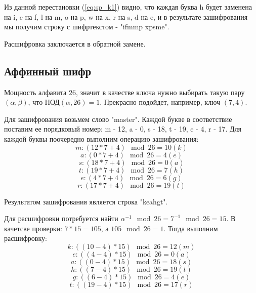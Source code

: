 \documentclass[a4paper]{article}
\begin{document}
  Из данной перестановки (\ref{eq:sp_k1}) видно, что каждая буква h будет заменена на i,
  e на f, l на m, o на p, w на x, r на s, d на e,
  и в результате зашифрования мы получим строку с шифртекстом - "ifmmp xpsme".

  Расшифровка заключается в обратной замене.

  \subsection{Аффинный шифр}

  Мощность алфавита 26, значит в качестве ключа нужно выбирать такую пару $(\alpha, \beta)$,
  что НОД$(\alpha, 26) = 1$. Прекрасно подойдет, например, ключ $(7, 4)$.

  Для зашифрования возьмем слово "master". Каждой букве в соответствие поставим ее
  порядковый номер: m - 12, a - 0, s - 18, t - 19, e - 4, r - 17. Для каждой буквы 
  поочередно выполним операцию зашифрования:
  \begin{equation}
    m: (12 * 7 + 4) \mod{26} = 10 (k)  
  \end{equation}
  \begin{equation}
    a: (0 * 7 + 4) \mod{26} = 4 (e)
  \end{equation}
  \begin{equation}
    s: (18 * 7 + 4) \mod{26} = 0 (a)
  \end{equation}
  \begin{equation}
    t: (19 * 7 + 4) \mod{26} = 7 (h)
  \end{equation}
  \begin{equation}
    e: (4 * 7 + 4) \mod{26} = 6 (g)
  \end{equation}
  \begin{equation}
    r: (17 * 7 + 4) \mod{26} = 19 (t)
  \end{equation}

  Результатом зашифрования является строка "keahgt".

  Для расшифровки потребуется найти $\alpha^{-1}\mod{26} = 7^{-1}\mod{26} = 15$.
  В качетсве проверки: $7 * 15 = 105$, а $105 \mod{26} = 1$. Тогда выполним расшифровку:
  \begin{equation}
    k: ((10 - 4) * 15) \mod{26} = 12 (m)
  \end{equation}
  \begin{equation}
    e: ((4 - 4) * 15) \mod{26} = 0 (a)
  \end{equation}
  \begin{equation}
    a: ((0 - 4) * 15) \mod{26} = 18 (s)
  \end{equation}
  \begin{equation}
    h: ((7 - 4) * 15) \mod{26} = 19 (t)
  \end{equation}
  \begin{equation}
    g: ((6 - 4) * 15) \mod{26} = 4 (e)
  \end{equation}
  \begin{equation}
    t: ((19 - 4) * 15) \mod{26} = 17 (r)
  \end{equation}
\end{document}
